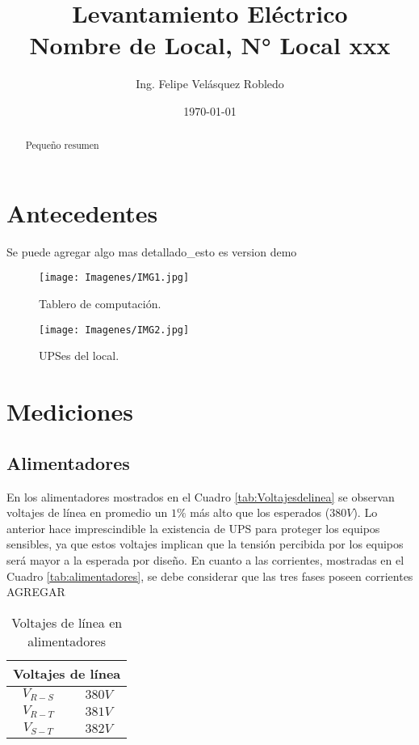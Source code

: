 \documentclass{article}
\title{Levantamiento Eléctrico\\Nombre de Local, N° Local xxx}
\author{Ing. Felipe Velásquez Robledo}
\date{\today}
\begin{document}
\maketitle
\pagestyle{fancy}
\thispagestyle{fancy}
\begin{abstract}
Pequeño resumen
\end{abstract}
\section{Antecedentes}
Se puede agregar algo mas detallado_esto es version demo

\begin{figure}
\centering
\texttt{[image: Imagenes/IMG1.jpg]}
\caption{\label{fig:Tablero}Tablero de computación.}
\end{figure}

\begin{figure}
\centering
\texttt{[image: Imagenes/IMG2.jpg]}
\caption{\label{fig:UPSes}UPSes del local.}
\end{figure}


\section{Mediciones}
\subsection{Alimentadores}
En los alimentadores mostrados en el Cuadro  \ref{tab:Voltajesdelinea} se observan voltajes de línea en promedio un $ 1\% $ más alto que los esperados ($380V$). Lo anterior hace imprescindible la existencia de UPS para proteger los equipos sensibles, ya que estos voltajes implican que la tensión percibida por los equipos será mayor a la esperada por diseño.
En cuanto a las corrientes, mostradas en el Cuadro \ref{tab:alimentadores}, se debe considerar que las tres fases poseen corrientes AGREGAR


\begin{center}
    \begin{table}[H]
        \centering
        \begin{tabular}{c c}
        \multicolumn{2}{c}{Voltajes de línea}\\\hline
             $V_{R-S}$ & $380 V$ \\
             $V_{R-T}$ & $381 V$ \\
             $V_{S-T}$ & $382 V$ \\
        \end{tabular}
        \caption{Voltajes de línea en alimentadores}
        \label{tab:Voltajesdelínea}
    \end{table}
\end{center}
\end{document}
